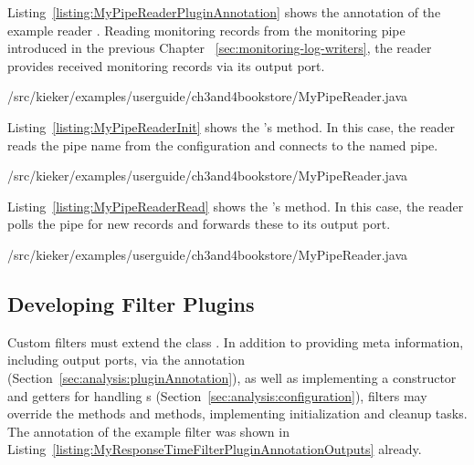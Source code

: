Listing~\ref{listing:MyPipeReaderPluginAnnotation} shows the  %
annotation  of the example reader . Reading monitoring %
records from the monitoring pipe introduced in the previous Chapter~%
\ref{sec:monitoring-log-writers}, the reader provides received monitoring %
records via its output port.

% 

\setJavaCodeListing
%
{\customComponentsBookstoreApplicationDir/src/kieker/examples/userguide/ch3and4bookstore/MyPipeReader.java}

\noindent Listing~\ref{listing:MyPipeReaderInit} shows the 's %
 method. In this case, the reader reads the pipe name from the %
configuration and connects to the named pipe. 

\setJavaCodeListing
%
{\customComponentsBookstoreApplicationDir/src/kieker/examples/userguide/ch3and4bookstore/MyPipeReader.java}

\pagebreak

\noindent Listing~\ref{listing:MyPipeReaderRead} shows the 's %
 method. In this case, the reader polls the pipe for new records %
and forwards these to its output port. 

\setJavaCodeListing
%
{\customComponentsBookstoreApplicationDir/src/kieker/examples/userguide/ch3and4bookstore/MyPipeReader.java}

\subsection{Developing Filter Plugins}\label{sec:analysis:filters}

Custom filters must extend the class . %
In addition to providing meta information, including output ports, via the %
 annotation %
(Section~\ref{sec:analysis:pluginAnnotation}), as well as implementing a constructor %
and getters for handling s (Section~\ref{sec:analysis:configuration}), %
filters may override the methods  and %
 methods, implementing initialization and cleanup tasks. %
The  annotation of the example filter  %
was shown in Listing~\ref{listing:MyResponseTimeFilterPluginAnnotationOutputs} already.

